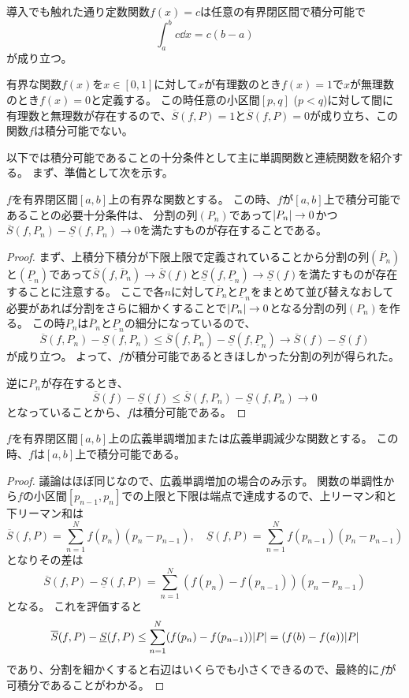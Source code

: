 \begin{example}
導入でも触れた通り定数関数$f(x) = c$は任意の有界閉区間で積分可能で
$$
\int_a^b c\dd{x} = c(b-a)
$$
が成り立つ。
\end{example}

\begin{example}
有界な関数$f(x)$を$x \in [0, 1]$に対して$x$が有理数のとき$f(x) = 1$で$x$が無理数のとき$f(x) = 0$と定義する。
この時任意の小区間$[p, q]$ ($p < q$)に対して間に有理数と無理数が存在するので、$\overline{S}(f, P) = 1$と$\overline{S}(f, P) = 0$が成り立ち、この関数$f$は積分可能でない。
\end{example}

以下では積分可能であることの十分条件として主に単調関数と連続関数を紹介する。
まず、準備として次を示す。

\begin{proposition}
$f$を有界閉区間$[a, b]$上の有界な関数とする。
この時、$f$が$[a, b]$上で積分可能であることの必要十分条件は、
分割の列$(P_n)$であって$\abs{P_n} \to 0$かつ$\overline{S}(f, P_n)-\underline{S}(f, P_n) \to 0$を満たすものが存在することである。
\end{proposition}

\begin{proof}
まず、上積分下積分が下限上限で定義されていることから分割の列$(\overline{P}_n)$と$(\underline{P}_n)$であって$\overline{S}(f, \overline{P}_n) \to \overline{S}(f)$と$\underline{S}(f, \underline{P}_n) \to \underline{S}(f)$を満たすものが存在することに注意する。
ここで各$n$に対して$\overline{P}_n$と$\underline{P}_n$をまとめて並び替えなおして必要があれば分割をさらに細かくすることで$\abs{P_n} \to 0$となる分割の列$(P_n)$を作る。
この時$P_n$は$\overline{P}_n$と$\underline{P}_n$の細分になっているので、
$$
\overline{S}(f, P_n)-\underline{S}(f, P_n) \le \overline{S}(f, \overline{P}_n)-\underline{S}(f, \underline{P}_n) \to \overline{S}(f)-\underline{S}(f)
$$
が成り立つ。
よって、$f$が積分可能であるときほしかった分割の列が得られた。

逆に$P_n$が存在するとき、
$$
\overline{S}(f)-\underline{S}(f) \le \overline{S}(f, P_n)-\underline{S}(f, P_n) \to 0
$$
となっていることから、$f$は積分可能である。
\end{proof}

\begin{theorem}[単調関数の可積分性]
$f$を有界閉区間$[a, b]$上の広義単調増加または広義単調減少な関数とする。
この時、$f$は$[a, b]$上で積分可能である。
\end{theorem}

\begin{proof}
議論はほぼ同じなので、広義単調増加の場合のみ示す。
関数の単調性から$f$の小区間$[p_{n-1}, p_n]$での上限と下限は端点で達成するので、上リーマン和と下リーマン和は
$$
\overline{S}(f, P) = \sum_{n = 1}^N f(p_n)(p_n-p_{n-1}),
\quad \underline{S}(f, P) = \sum_{n = 1}^N f(p_{n-1})(p_n-p_{n-1})
$$
となりその差は
$$
\overline{S}(f, P)-\underline{S}(f, P) = \sum_{n = 1}^N (f(p_n)-f(p_{n-1}))(p_n-p_{n-1})
$$
となる。
これを評価すると
$$
\overline{S}(f, P)-\underline{S}(f, P) \le \sum_{n = 1}^N (f(p_n)-f(p_{n-1}))\abs{P} = (f(b)-f(a))\abs{P}
$$
であり、分割を細かくすると右辺はいくらでも小さくできるので、最終的に$f$が可積分であることがわかる。
\end{proof}

